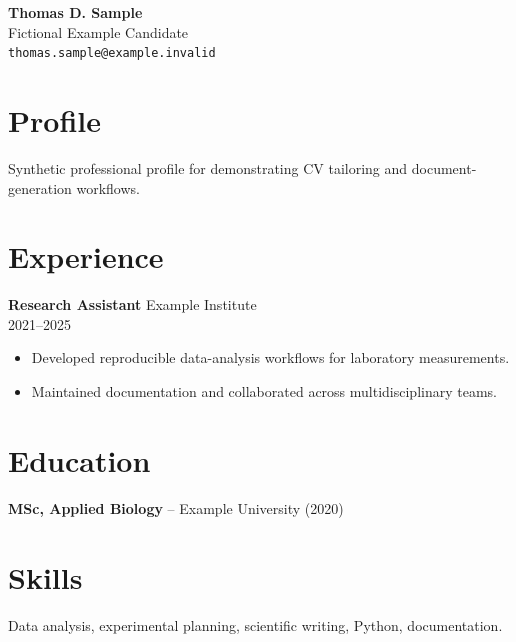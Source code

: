 \documentclass[11pt,a4paper]{article}
\begin{document}
\begin{center}
{\LARGE \textbf{Thomas D. Sample}}\\
Fictional Example Candidate\\
\texttt{thomas.sample@example.invalid}\\
\end{center}
\section*{Profile}
Synthetic professional profile for demonstrating CV tailoring and document-generation workflows.
\section*{Experience}
\textbf{Research Assistant} \hfill Example Institute\\
2021--2025\\
\begin{itemize}
\item Developed reproducible data-analysis workflows for laboratory measurements.
\item Maintained documentation and collaborated across multidisciplinary teams.
\end{itemize}
\section*{Education}
\textbf{MSc, Applied Biology} -- Example University (2020)
\section*{Skills}
Data analysis, experimental planning, scientific writing, Python, documentation.
\end{document}
